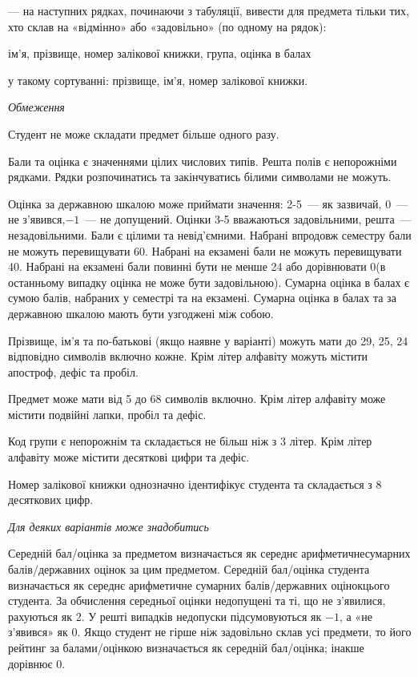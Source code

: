 \documentclass[11pt, ukrainian]{article}
\begin{document}
{\noindent}--- на наступних рядках, починаючи з табуляції, вивести для предмета тільки тих, хто склав на «відмінно» або «задовільно» (по одному на рядок):\par
ім’я, прізвище, номер залікової книжки, група, оцінка в балах

{\noindent}у такому сортуванні: прізвище, ім’я, номер залікової книжки.


\bigskip\textit{Обмеження}

Студент не може складати предмет більше одного разу.

Бали та оцінка є значеннями цілих числових типів. Решта полів є непорожніми рядками.
Рядки розпочинатись та закінчуватись білими символами не можуть.

Оцінка за державною шкалою може приймати значення: 2-5~--- як зазвичай, 0~--- не з’явився,$-1$~--- не допущений. 
Оцінки 3-5 вважаються задовільними, решта~--- незадовільними. 
Бали є цілими та невід’ємними.
Набрані впродовж семестру бали не можуть перевищувати 60. 
Набрані на екзамені бали не можуть перевищувати 40. 
Набрані на екзамені бали повинні бути не менше 24 або дорівнювати 0(в останньому випадку оцінка не може бути задовільною). 
Сумарна оцінка в балах є сумою балів, набраних у семестрі та на екзамені.
Сумарна оцінка в балах та за державною шкалою мають бути узгоджені між собою.

Прізвище, ім’я та по-батькові (якщо наявне у варіанті) можуть мати до 29, 25, 24 відповідно символів включно кожне. 
Крім літер алфавіту можуть містити апостроф, дефіс та пробіл.

Предмет може мати від 5 до 68 символів включно. 
Крім літер алфавіту може містити подвійні лапки, пробіл та дефіс.

Код групи є непорожнім та складається не більш ніж з 3 літер. 
Крім літер алфавіту може містити десяткові цифри та дефіс.


Номер залікової книжки однозначно ідентифікує студента та складається з 8 десяткових цифр. 

\bigskip\textit{Для деяких варіантів може знадобитись}

Середній бал/оцінка за предметом визначається як середнє арифметичнесумарних балів/державних оцінок за цим предметом. 
Середній бал/оцінка студента визначається як середнє арифметичне сумарних балів/державних оцінокцього студента. 
За обчислення середньої оцінки недопущені та ті, що не з’явилися, рахуються як 2.
У решті випадків недопуски підсумовуються як $-1$, а «не з’явився» як 0.
Якщо студент не гірше ніж задовільно склав усі предмети, 
то його рейтинг за балами/оцінкою визначається як середній бал/оцінка; інакше дорівнює 0.
\end{document}
